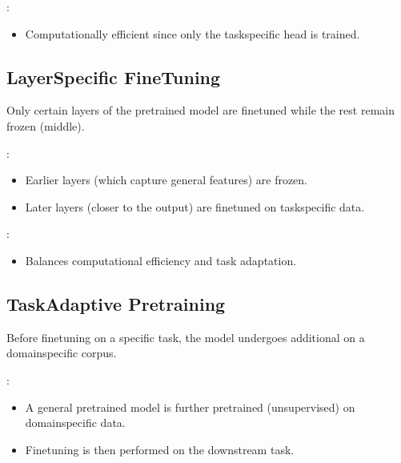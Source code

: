 \documentclass[letterpaper,11pt,english]{sphinxmanual}
\begin{document}
\sphinxAtStartPar
{}:
\begin{itemize}
\item {} 
\sphinxAtStartPar
Computationally efficient since only the task\sphinxhyphen{}specific head is trained.

\end{itemize}


\subsection{Layer\sphinxhyphen{}Specific Fine\sphinxhyphen{}Tuning}
\label{\detokenize{finetuning:layer-specific-fine-tuning}}
\sphinxAtStartPar
Only certain layers of the pre\sphinxhyphen{}trained model are fine\sphinxhyphen{}tuned while the rest remain frozen {\hyperref[\detokenize{finetuning:fig-fine-tuning}]{}} (middle).

\sphinxAtStartPar
{}:
\begin{itemize}
\item {} 
\sphinxAtStartPar
Earlier layers (which capture general features) are frozen.

\item {} 
\sphinxAtStartPar
Later layers (closer to the output) are fine\sphinxhyphen{}tuned on task\sphinxhyphen{}specific data.

\end{itemize}

\sphinxAtStartPar
{}:
\begin{itemize}
\item {} 
\sphinxAtStartPar
Balances computational efficiency and task adaptation.

\end{itemize}


\subsection{Task\sphinxhyphen{}Adaptive Pre\sphinxhyphen{}training}
\label{\detokenize{finetuning:task-adaptive-pre-training}}
\sphinxAtStartPar
Before fine\sphinxhyphen{}tuning on a specific task, the model undergoes additional  on a domain\sphinxhyphen{}specific corpus.

\sphinxAtStartPar
{}:
\begin{itemize}
\item {} 
\sphinxAtStartPar
A general pre\sphinxhyphen{}trained model is further pre\sphinxhyphen{}trained (unsupervised) on domain\sphinxhyphen{}specific data.

\item {} 
\sphinxAtStartPar
Fine\sphinxhyphen{}tuning is then performed on the downstream task.

\end{itemize}
\end{document}
